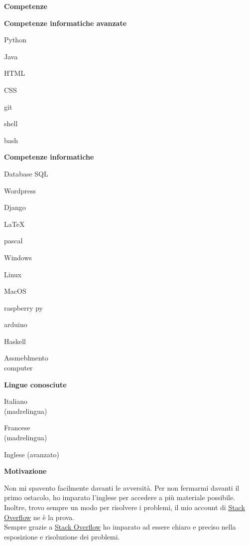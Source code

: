 \documentclass[a4paper,12pt,final]{memoir}
\newcommand{\Sep}{\vspace{1.5em}}
\newcommand{\SmallSep}{\vspace{0.5em}}
\newcommand{\CVSection}[1]
	{\Large\textbf{#1}\par
	\SmallSep\normalsize\normalfont}
\newcommand{\CVItem}[1]
	{\textbf{\color{RoyalBlue} #1}}
\begin{document}
\CVSection{Competenze}
\CVItem{Competenze informatiche avanzate}
\begin{multicols}{3}
\begin{compactitem}[\color{RoyalBlue}$\circ$]
	\item Python 
	\item Java
	\item HTML
	\item CSS
	\item git
	\item shell
	\item bash
\end{compactitem}
\end{multicols}
\SmallSep

\CVItem{Competenze informatiche}
\begin{multicols}{3}
\begin{compactitem}[\color{RoyalBlue}$\circ$]
	\item Database SQL
	\item Wordpress
	\item Django
	\item \LaTeX
	\item pascal
	\item Windows
	\item Linux
	\item MacOS
	\item raspberry py
	\item arduino
	\item Haskell
	\item Assmeblmento\\computer
\end{compactitem}
\end{multicols}
\SmallSep

\clearpage
\framebreak
\framebreak

\CVItem{Lingue conosciute}
\begin{multicols}{3}
\begin{compactitem}[\color{RoyalBlue}$\circ$]
	\item Italiano\\(madrelingua)
	\item Francese\\(madrelingua)
	\item Inglese (avanzato)
\end{compactitem}
\end{multicols}
\Sep 

\CVSection{Motivazione}
	Non mi spavento facilmente davanti le avversità.
	Per non fermarmi davanti il primo ostacolo, ho imparato l'inglese per accedere a più materiale possibile.
	\\Inoltre, trovo sempre un modo per risolvere i problemi, il mio account di \href{https://stackoverflow.com/users/6875945/mattia-rubini}{Stack Overflow} ne è la prova.
	\\Sempre grazie a \href{https://stackoverflow.com/users/6875945/mattia-rubini}{Stack Overflow} ho imparato ad essere chiaro e preciso nella esposizione e risoluzione dei problemi.
\end{document}
